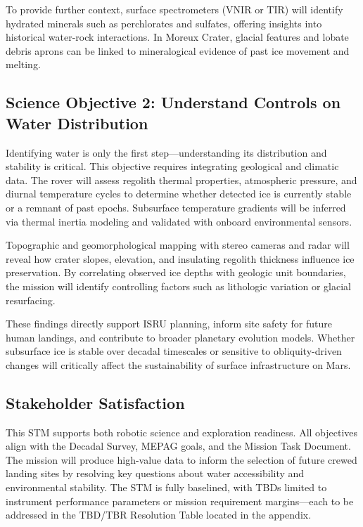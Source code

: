 To provide further context, surface spectrometers (VNIR or TIR) will identify hydrated minerals such as perchlorates and sulfates, offering insights into historical water-rock interactions. In Moreux Crater, glacial features and lobate debris aprons can be linked to mineralogical evidence of past ice movement and melting.

\subsection*{Science Objective 2: Understand Controls on Water Distribution}

Identifying water is only the first step—understanding its distribution and stability is critical. This objective requires integrating geological and climatic data. The rover will assess regolith thermal properties, atmospheric pressure, and diurnal temperature cycles to determine whether detected ice is currently stable or a remnant of past epochs. Subsurface temperature gradients will be inferred via thermal inertia modeling and validated with onboard environmental sensors.

Topographic and geomorphological mapping with stereo cameras and radar will reveal how crater slopes, elevation, and insulating regolith thickness influence ice preservation. By correlating observed ice depths with geologic unit boundaries, the mission will identify controlling factors such as lithologic variation or glacial resurfacing.

These findings directly support ISRU planning, inform site safety for future human landings, and contribute to broader planetary evolution models. Whether subsurface ice is stable over decadal timescales or sensitive to obliquity-driven changes will critically affect the sustainability of surface infrastructure on Mars.

\subsection*{Stakeholder Satisfaction}

This STM supports both robotic science and exploration readiness. All objectives align with the Decadal Survey, MEPAG goals, and the Mission Task Document. The mission will produce high-value data to inform the selection of future crewed landing sites by resolving key questions about water accessibility and environmental stability. The STM is fully baselined, with TBDs limited to instrument performance parameters or mission requirement margins—each to be addressed in the TBD/TBR Resolution Table located in the appendix.